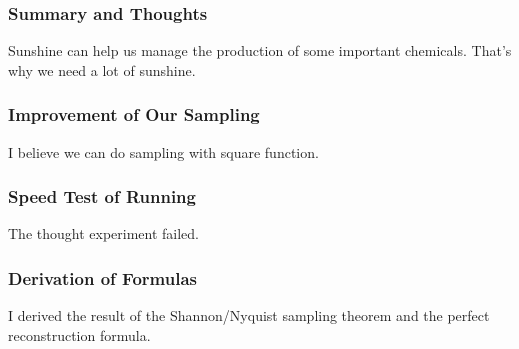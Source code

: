 \documentclass{article}
\begin{document}
    \subsubsection*{Summary and Thoughts} Sunshine can help us manage the
     production of some important chemicals. That's why we need a lot of
     sunshine.
    \subsubsection*{Improvement of Our Sampling} I believe we can do sampling
     with square function.
    \subsubsection*{Speed Test of Running} The thought experiment failed.
    \subsubsection*{Derivation of Formulas} I derived the result of the
     Shannon/Nyquist sampling theorem and the perfect reconstruction
     formula.

% 
% 


\end{document}
